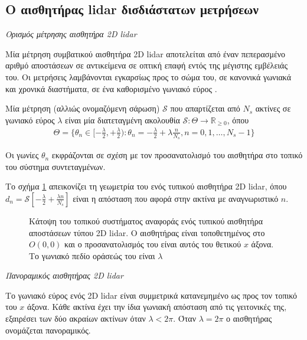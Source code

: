 \subsection{Ο αισθητήρας lidar δισδιάστατων μετρήσεων}
\label{subsec:01_01_02_4}

\begin{bw_box}
\begin{definition}
  \label{def:lidar}
  \textit{Ορισμός μέτρησης αισθητήρα 2D lidar}

  Μία μέτρηση συμβατικού αισθητήρα 2D lidar αποτελείται από έναν πεπερασμένο
  αριθμό αποστάσεων σε αντικείμενα σε οπτική επαφή εντός της μέγιστης
  εμβέλειάς του. Οι μετρήσεις λαμβάνονται εγκαρσίως προς το σώμα του, σε
  κανονικά γωνιακά και χρονικά διαστήματα, σε ένα καθορισμένο γωνιακό εύρος
  \cite{Cooper2018a}.

  Μία μέτρηση (αλλιώς ονομαζόμενη σάρωση) $\mathcal{S}$ που απαρτίζεται από
  $N_s$ ακτίνες σε γωνιακό εύρος $\lambda$ είναι μία διατεταγμένη ακολουθία
  $\mathcal{S} : \Theta \rightarrow
  \mathbb{R}_{\geq 0}$, όπου
  \begin{align}
  \Theta = \{\theta_n \in [-\frac{\lambda}{2}, +\frac{\lambda}{2}) :
    \theta_n = -\frac{\lambda}{2} + \lambda \frac{n}{N_s},
  n = 0,1,\dots, N_s-1\}
  \end{align}

  Οι γωνίες $\theta_n$ εκφράζονται σε σχέση με τον προσανατολισμό του αισθητήρα
  στο τοπικό του σύστημα συντεταγμένων.
\end{definition}
\end{bw_box}

Το σχήμα \ref{fig:laser} απεικονίζει τη γεωμετρία του ενός τυπικού αισθητήρα
2D lidar, όπου $d_n = \mathcal{S}[-\frac{\lambda}{2} + \frac{\lambda n}{N_s}]$
είναι η απόσταση που αφορά στην ακτίνα με αναγνωριστικό $n$.

\begin{figure}[htbp]\centering
  
  \caption{\small Κάτοψη του τοπικού συστήματος αναφοράς ενός τυπικού αισθητήρα
           αποστάσεων τύπου 2D lidar. Ο αισθητήρας είναι τοποθετημένος στο
           $O(0,0)$ και ο προσανατολισμός του είναι αυτός του θετικού $x$
           άξονα. Το γωνιακό πεδίο οράσεώς του είναι $\lambda$}
  \label{fig:laser}
\end{figure}

\begin{bw_box}
\begin{definition}
  \textit{Πανοραμικός αισθητήρας 2D lidar}

  Το γωνιακό εύρος ενός 2D lidar είναι συμμετρικά κατανεμημένο ως προς τον
  τοπικό του $x$ άξονα. Κάθε ακτίνα έχει την ίδια γωνιακή απόσταση από τις
  γειτονικές της, εξαιρέσει των δύο ακραίων ακτίνων όταν $\lambda < 2\pi$.
  Όταν $\lambda = 2\pi$ ο αισθητήρας ονομάζεται πανοραμικός.
\end{definition}
\end{bw_box}



